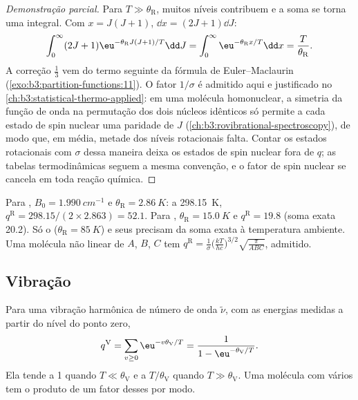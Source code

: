 \begin{proof}[Demonstração parcial]
Para $T \gg \theta_{\mathrm R}$, muitos níveis contribuem e a soma se torna uma integral.
Com $x = J(J+1)$, $\dd x = (2J+1)\dd J$:
\[
  \int_0^\infty(2J+1)\eu^{-\theta_{\mathrm R}J(J+1)/T}\dd J = \int_0^\infty\eu^{-\theta_{\mathrm R}x/T}\dd x
  = \frac{T}{\theta_{\mathrm R}}.
\]
A correção $\frac13$ vem do termo seguinte da fórmula de Euler--Maclaurin
(\cref{exo:b3:partition-functions:11}). O fator $1/\sigma$ é admitido aqui e
justificado no \cref{ch:b3:statistical-thermo-applied}: em uma molécula
homonuclear, a simetria da função de onda na permutação dos dois núcleos
idênticos só permite a cada estado de spin nuclear uma paridade de $J$
(\cref{ch:b3:rovibrational-spectroscopy}), de modo que, em média, metade dos
níveis rotacionais falta. Contar os estados rotacionais com $\sigma$ dessa maneira
deixa os estados de spin nuclear fora de $q$; as tabelas termodinâmicas seguem a
mesma convenção, e o fator de spin nuclear se cancela em toda reação química.
\end{proof}

Para , $B_0 = \qty{1.990}{cm^{-1}}$ e $\theta_{\mathrm R} = \qty{2.86}{K}$: a \qty{298.15}{K},
$q^{\mathrm R} = 298.15/(2\times2.863) = 52.1$. Para , $\theta_{\mathrm R} = \qty{15.0}{K}$ e
$q^{\mathrm R} = 19.8$ (soma exata 20.2). Só o  ($\theta_{\mathrm R} = \qty{85}{K}$) e seus 
precisam da soma exata à temperatura ambiente. Uma molécula não linear de  $A$, $B$, $C$ tem $q^{\mathrm R} = \frac{1}{\sigma}\bigl(\frac{kT}{hc}\bigr)^{3/2}\sqrt{\frac{\pi}{ABC}}$, admitido.

\subsection*{Vibração}

\begin{proposition}\label{prop:b3:partition-functions:q-vib}
Para uma vibração harmônica de número de onda $\tilde\nu$, com as energias medidas a
partir do nível do ponto zero,
\[
  q^{\mathrm V} = \sum_{v\ge0}\eu^{-v\theta_{\mathrm V}/T} = \frac{1}{1 - \eu^{-\theta_{\mathrm V}/T}} .
\]
Ela tende a 1 quando $T \ll \theta_{\mathrm V}$ e a $T/\theta_{\mathrm V}$ quando $T \gg \theta_{\mathrm V}$. Uma molécula
com vários  tem o produto de um fator desses por modo.
\end{proposition}

